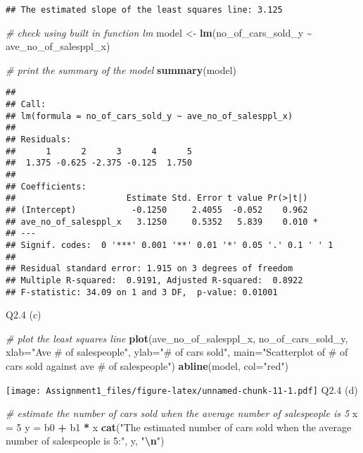 \documentclass[
]{article}
\newenvironment{Shaded}{\begin{snugshade}}{\end{snugshade}}
\newcommand{\AttributeTok}[1]{\textcolor[rgb]{0.13,0.29,0.53}{#1}}
\newcommand{\CommentTok}[1]{\textcolor[rgb]{0.56,0.35,0.01}{\textit{#1}}}
\newcommand{\DecValTok}[1]{\textcolor[rgb]{0.00,0.00,0.81}{#1}}
\newcommand{\FunctionTok}[1]{\textcolor[rgb]{0.13,0.29,0.53}{\textbf{#1}}}
\newcommand{\NormalTok}[1]{#1}
\newcommand{\OtherTok}[1]{\textcolor[rgb]{0.56,0.35,0.01}{#1}}
\newcommand{\SpecialCharTok}[1]{\textcolor[rgb]{0.81,0.36,0.00}{\textbf{#1}}}
\newcommand{\StringTok}[1]{\textcolor[rgb]{0.31,0.60,0.02}{#1}}
\begin{document}
\begin{verbatim}
## The estimated slope of the least squares line: 3.125
\end{verbatim}

\begin{Shaded}
\begin{Highlighting}[]
\CommentTok{\# check using built in function \textquotesingle{}lm\textquotesingle{}}
\NormalTok{model }\OtherTok{\textless{}{-}} \FunctionTok{lm}\NormalTok{(no\_of\_cars\_sold\_y }\SpecialCharTok{\textasciitilde{}}\NormalTok{ ave\_no\_of\_salesppl\_x)}

\CommentTok{\# print the summary of the model}
\FunctionTok{summary}\NormalTok{(model)}
\end{Highlighting}
\end{Shaded}

\begin{verbatim}
## 
## Call:
## lm(formula = no_of_cars_sold_y ~ ave_no_of_salesppl_x)
## 
## Residuals:
##      1      2      3      4      5 
##  1.375 -0.625 -2.375 -0.125  1.750 
## 
## Coefficients:
##                      Estimate Std. Error t value Pr(>|t|)  
## (Intercept)           -0.1250     2.4055  -0.052    0.962  
## ave_no_of_salesppl_x   3.1250     0.5352   5.839    0.010 *
## ---
## Signif. codes:  0 '***' 0.001 '**' 0.01 '*' 0.05 '.' 0.1 ' ' 1
## 
## Residual standard error: 1.915 on 3 degrees of freedom
## Multiple R-squared:  0.9191, Adjusted R-squared:  0.8922 
## F-statistic: 34.09 on 1 and 3 DF,  p-value: 0.01001
\end{verbatim}

Q2.4 (c)

\begin{Shaded}
\begin{Highlighting}[]
\CommentTok{\# plot the least squares line}
\FunctionTok{plot}\NormalTok{(ave\_no\_of\_salesppl\_x, no\_of\_cars\_sold\_y, }\AttributeTok{xlab=}\StringTok{"Ave \# of salespeople"}\NormalTok{, }\AttributeTok{ylab=}\StringTok{"\# of cars sold"}\NormalTok{, }\AttributeTok{main=}\StringTok{"Scatterplot of \# of cars sold against ave \# of salespeople"}\NormalTok{)}
\FunctionTok{abline}\NormalTok{(model, }\AttributeTok{col=}\StringTok{"red"}\NormalTok{)}
\end{Highlighting}
\end{Shaded}

\texttt{[image: Assignment1\_files/figure-latex/unnamed-chunk-11-1.pdf]}
Q2.4 (d)

\begin{Shaded}
\begin{Highlighting}[]
\CommentTok{\# estimate the number of cars sold when the average number of salespeople is 5}
\NormalTok{x }\OtherTok{=} \DecValTok{5}
\NormalTok{y }\OtherTok{=}\NormalTok{ b0 }\SpecialCharTok{+}\NormalTok{ b1 }\SpecialCharTok{*}\NormalTok{ x}
\FunctionTok{cat}\NormalTok{(}\StringTok{"The estimated number of cars sold when the average number of salespeople is 5:"}\NormalTok{, y, }\StringTok{"}\SpecialCharTok{\textbackslash{}n}\StringTok{"}\NormalTok{)}
\end{Highlighting}
\end{Shaded}
\end{document}
